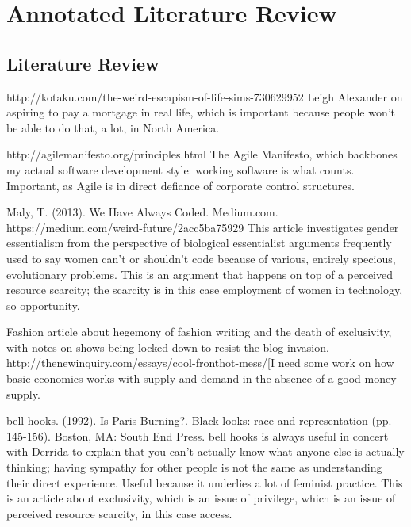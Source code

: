 
\chapter{Annotated Literature Review} %

\label{LitReview} %



\section{Literature Review}

http://kotaku.com/the-weird-escapism-of-life-sims-730629952 Leigh Alexander on aspiring to pay a mortgage in real life, which is important because people won’t be able to do that, a lot, in North America. 

http://agilemanifesto.org/principles.html The Agile Manifesto, which backbones my actual software development style: working software is what counts. Important, as Agile is in direct defiance of corporate control structures.

Maly, T. (2013). We Have Always Coded. Medium.com. https://medium.com/weird-future/2acc5ba75929
	This article investigates gender essentialism from the perspective of biological essentialist arguments frequently used to say women can’t or shouldn’t code because of various, entirely specious, evolutionary problems. This is an argument that happens on top of a perceived resource scarcity; the scarcity is in this case employment of women in technology, so opportunity.

Fashion article about hegemony of fashion writing and the death of exclusivity, with notes on shows being locked down to resist the blog invasion. http://thenewinquiry.com/essays/cool-fronthot-mess/[I need some work on how basic economics works with supply and demand in the absence of a good money supply.

bell hooks. (1992). Is Paris Burning?. Black looks: race and representation (pp. 145-156). Boston, MA: South End Press.
	bell hooks is always useful in concert with Derrida to explain that you can’t actually know what anyone else is actually thinking; having sympathy for other people is not the same as understanding their direct experience. Useful because it underlies a lot of feminist practice. This is an article about exclusivity, which is an issue of privilege, which is an issue of perceived resource scarcity, in this case access.


